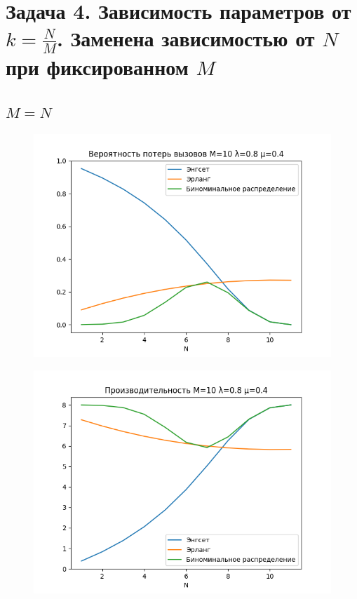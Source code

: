 \documentclass[12pt]{article}
\let\Oldsection\section
\renewcommand{\section}{\FloatBarrier\Oldsection}
\let\Oldsubsection\subsection
\renewcommand{\subsection}{\FloatBarrier\Oldsubsection}
\begin{document}
\section{Задача 4. Зависимость параметров от $k = \frac{N}{M}$. Заменена зависимостью от $N$ при фиксированном $M$}
\subsection{$M = N$}
\begin{figure}[!htb]
\centering
\includegraphics[scale=1.00]{assets/iss_4/loss_prob_M10_lam08_mu04.png}
\caption{}
\label{}
\end{figure}

\begin{figure}[!htb]
\centering
\includegraphics[scale=1.00]{assets/iss_4/perf_M10_lam08_mu04.png}
\caption{}
\label{}
\end{figure}
\end{document}
